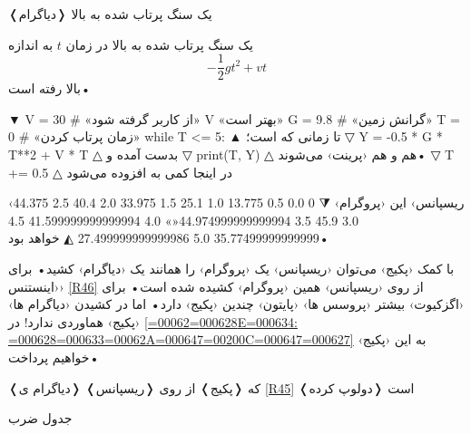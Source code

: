 \documentclass[openany, twocolumn]{book}
\begin{document}
\begin{InlinePrograms}
\begin{Program}
\caption{❬دیاگرام❭ یک سنگ پرتاب شده به بالا\label{R45}}

یک سنگ پرتاب شده به بالا در زمان $t$ به اندازه
\[
-\frac{1}{2}gt^{2}+vt
\]
بالا رفته است•

▼
V = 30	# «از کاربر گرفته شود» V «بهتر است»
G = 9.8	# «گرانش زمین»
T = 0	# «زمان پرتاب کردن»
while T <= 5:
▲
 تا زمانی که  است؛ 
▽
	Y = -0.5 * G * T**2 + V * T
△
  بدست آمده و 
▽
	print(T, Y)
△
 هم  و  هم ‹پرینت› می‌شوند• 
▽
	T += 0.5
△
 در اینجا کمی به  افزوده می‌شود

‹ریسپانس› این ‹پروگرام› 
⧨
0 0.0
0.5 13.775
1.0 25.1
1.5 33.975
2.0 40.4
2.5 44.375
3.0 45.9
3.5 44.974999999999994«\NewNoteMark»
4.0 41.599999999999994
4.5 35.77499999999999
5.0 27.499999999999986
◭
 خواهد بود•

با کمک ‹پکیج›  می‌توان ‹ریسپانس› یک ‹پروگرام› را همانند یک ‹دیاگرام› کشید• برای ‹اینستنس› \ref{R46} از روی ‹ریسپانس› همین ‹پروگرام› کشیده شده است• برای ‹اگزکیوت› بیشتر ‹پروسس ها› ‹پایتون› چندین ‹پکیج› دارد• اما در کشیدن ‹دیاگرام ها› ‹پکیج›  هماوردی ندارد! در \ref{=000628=00062E=000634: =000628=000633=00062A=000647=00200C=000647=000627} به این ‹پکیج› خواهیم پرداخت•
\end{Program}

\begin{Figure}

\caption{❬دیاگرام ی❭ که ❬پکیج❭  از روی ❬ریسپانس❭ \ref{R45} ❬دولوپ کرده❭ است\label{R46}}
\end{Figure}

\begin{Program}
\caption{جدول ضرب\label{R47}}


\end{Program}
\end{InlinePrograms}
\end{document}
